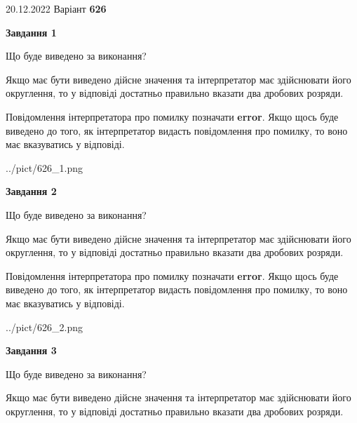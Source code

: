 \documentclass[12pt, ukrainian]{article}
\begin{document}
{20.12.2022 Варіант \No \textbf { 626 }\par}
{
\begin {Large}

{\begin {center}\textbf{Завдання 1}\end {center}}\par
Що буде виведено за виконання? \par

Якщо має бути виведено дійсне значення та інтерпретатор має здійснювати його округлення, 
то у відповіді достатньо правильно вказати два дробових розряди.

Повідомлення інтерпретатора про помилку позначати \textbf{error}.
Якщо щось буде виведено до того, як інтерпретатор видасть повідомлення про помилку, 
то воно має вказуватись у відповіді. \par

\begin{center}
	{../pict/626_1.png}
\end{center}
\newpage

{\begin {center}\textbf{Завдання 2}\end {center}}\par
Що буде виведено за виконання? \par

Якщо має бути виведено дійсне значення та інтерпретатор має здійснювати його округлення, 
то у відповіді достатньо правильно вказати два дробових розряди.

Повідомлення інтерпретатора про помилку позначати \textbf{error}.
Якщо щось буде виведено до того, як інтерпретатор видасть повідомлення про помилку, 
то воно має вказуватись у відповіді. \par

\begin{center}
	{../pict/626_2.png}
\end{center}
\newpage

{\begin {center}\textbf{Завдання 3}\end {center}}\par
Що буде виведено за виконання? \par

Якщо має бути виведено дійсне значення та інтерпретатор має здійснювати його округлення, 
то у відповіді достатньо правильно вказати два дробових розряди.


\end{Large}}
\end{document}
